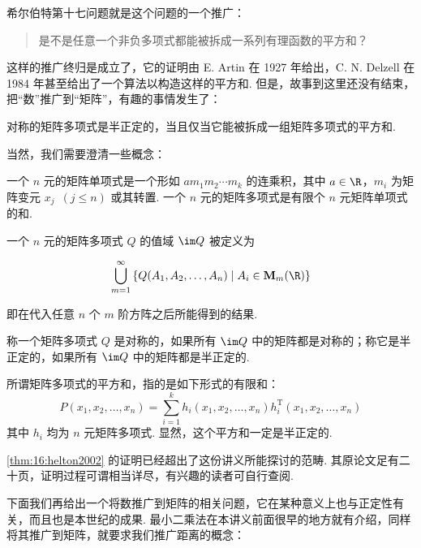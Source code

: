 希尔伯特第十七问题就是这个问题的一个推广：
\begin{quote}
    \kaishu
    是不是任意一个非负多项式都能被拆成一系列有理函数的平方和？
\end{quote}

这样的推广终归是成立了，它的证明由 E. Artin 在 1927 年给出，C. N. Delzell 在 1984 年甚至给出了一个算法以构造这样的平方和. 但是，故事到这里还没有结束，把``数''推广到``矩阵''，有趣的事情发生了：

\begin{theorem}[Helton, 2002]\label{thm:16:helton2002}
    对称的矩阵多项式是半正定的，当且仅当它能被拆成一组矩阵多项式的平方和.
\end{theorem}

当然，我们需要澄清一些概念：

\begin{definition}
    一个 $n$ 元的矩阵单项式是一个形如 $am_1m_2 \cdots m_k$ 的连乘积，其中 $a \in \R$，$m_i$ 为矩阵变元 $x_j \enspace(j \leqslant n)$ 或其转置. 一个 $n$ 元的矩阵多项式是有限个 $n$ 元矩阵单项式的和.
\end{definition}

\begin{definition}
    一个 $n$ 元的矩阵多项式 $Q$ 的值域 $\im Q$ 被定义为

    \[ \bigcup_{m = 1}^\infty\left\{Q(A_1, A_2, \ldots, A_n) \mid A_i \in \mathbf{M}_m(\R)\right\} \]

    即在代入任意 $n$ 个 $m$ 阶方阵之后所能得到的结果.
\end{definition}

\begin{definition}
    称一个矩阵多项式 $Q$ 是对称的，如果所有 $\im Q$ 中的矩阵都是对称的；称它是半正定的，如果所有 $\im Q$ 中的矩阵都是半正定的.
\end{definition}

\begin{definition}
    所谓矩阵多项式的平方和，指的是如下形式的有限和：
    \[ P(x_1, x_2, \ldots, x_n) = \sum_{i = 1}^k h_i(x_1, x_2, \ldots, x_n)h_i^\mathrm{T}(x_1, x_2, \ldots, x_n) \]
    其中 $h_i$ 均为 $n$ 元矩阵多项式. 显然，这个平方和一定是半正定的.
\end{definition}

\autoref{thm:16:helton2002} 的证明已经超出了这份讲义所能探讨的范畴. 其原论文足有二十页，证明过程可谓相当详尽，有兴趣的读者可自行查阅.

下面我们再给出一个将数推广到矩阵的相关问题，它在某种意义上也与正定性有关，而且也是本世纪的成果. 最小二乘法在本讲义前面很早的地方就有介绍，同样将其推广到矩阵，就要求我们推广距离的概念：


